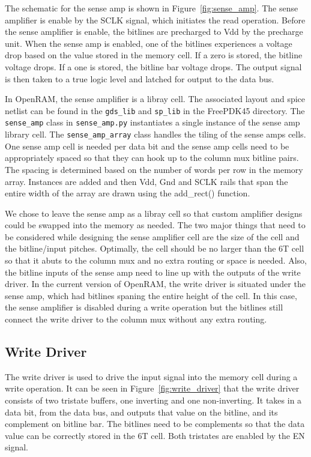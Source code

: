 The schematic for the sense amp is shown in
Figure~\ref{fig:sense_amp}.  The sense amplifier is enable by the SCLK
signal, which initiates the read operation.  Before the sense
amplifier is enable, the bitlines are precharged to Vdd by the
precharge unit.  When the sense amp is enabled, one of the bitlines
experiences a voltage drop based on the value stored in the memory
cell.  If a zero is stored, the bitline voltage drops.  If a one is
stored, the bitline bar voltage drops.  The output signal is then
taken to a true logic level and latched for output to the data bus.

In OpenRAM, the sense amplifier is a libray cell.  The associated
layout and spice netlist can be found in the \verb|gds_lib| and \verb|sp_lib| in
the FreePDK45 directory.  The \verb|sense_amp| class in \verb|sense_amp.py|
instantiates a single instance of the sense amp library cell.  The
\verb|sense_amp_array| class handles the tiling of the sense amps cells.
One sense amp cell is needed per data bit and the sense amp cells need
to be appropriately spaced so that they can hook up to the column mux
bitline pairs.  The spacing is determined based on the number of words
per row in the memory array.  Instances are added and then Vdd, Gnd
and SCLK rails that span the entire width of the array are drawn using
the add\_rect() function.

We chose to leave the sense amp as a libray cell so that custom
amplifier designs could be swapped into the memory as needed.  The two
major things that need to be considered while designing the sense
amplifier cell are the size of the cell and the bitline/input pitches.
Optimally, the cell should be no larger than the 6T cell so that it
abuts to the column mux and no extra routing or space is needed.
Also, the bitline inputs of the sense amp need to line up with the
outputs of the write driver.  In the current version of OpenRAM, the
write driver is situated under the sense amp, which had bitlines
spaning the entire height of the cell.  In this case, the sense
amplifier is disabled during a write operation but the bitlines still
connect the write driver to the column mux without any extra routing.


\subsection{Write Driver}
\label{sec:writedriver}
The write driver is used to drive the input signal into the memory
cell during a write operation.  It can be seen in
Figure~\ref{fig:write_driver} that the write driver consists of two
tristate buffers, one inverting and one non-inverting.  It takes in a
data bit, from the data bus, and outputs that value on the bitline,
and its complement on bitline bar.  The bitlines need to be
complements so that the data value can be correctly stored in the 6T
cell. Both tristates are enabled by the EN signal.

